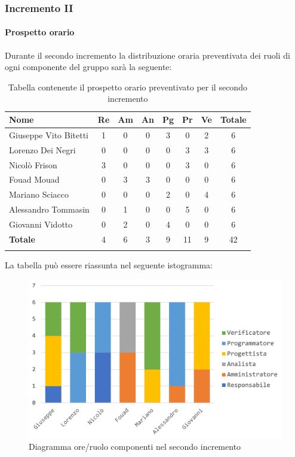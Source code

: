 		
		
		\subsubsection{Incremento II}
			\paragraph{Prospetto orario}
			Durante il secondo incremento la distribuzione oraria preventivata dei ruoli di ogni componente del gruppo sarà la seguente:
			
			\begin{longtable}{|l|c|c|c|c|c|c|c|}
				\hline
				\rowcolor{lighter-grayer}
				\textbf{Nome} & \textbf{Re} & \textbf{Am} & \textbf{An} & \textbf{Pg}  & \textbf{Pr}   & \textbf{Ve} & \textbf{Totale} \\
				\hline
				\endfirsthead
				
				\hline
				Giuseppe Vito Bitetti 		 & 1 & 0 & 0 & 3 & 0 & 2 & 6\\
				\hline
				\hline
				Lorenzo Dei Negri			 & 0 & 0 & 0 & 0 & 3 & 3 & 6\\
				\hline
				\hline
				Nicolò Frison				    & 3 & 0 & 0 & 0 & 3 & 0 & 6\\
				\hline
				\hline
				Fouad Mouad 				 & 0 & 3 & 3 & 0 & 0 & 0 & 6\\
				\hline
				\hline
				Mariano Sciacco 			 & 0 & 0 & 0 & 2 & 0 & 4 & 6\\
				\hline
				\hline
				Alessandro Tommasin    & 0 & 1 & 0 & 0 & 5 & 0 & 6\\
				\hline
				\hline
				Giovanni Vidotto 			 & 0 & 2 & 0 & 4 & 0 & 0 & 6\\
				\hline 
				\textbf{Totale}			 		& 4 & 6 & 3 & 9 & 11 & 9 & 42\\
				\hline
				\caption{Tabella contenente il prospetto orario preventivato per il secondo incremento}
			\end{longtable}
			\pagebreak
			
			La tabella può essere riassunta nel seguente istogramma:
			\begin{figure}[H]
				\centering
				\includegraphics[width=0.8\linewidth]{./images/preventivo/incremento2-1.png}
				\caption{Diagramma ore/ruolo componenti nel secondo incremento}
				\label{fig:diagramma suddivione ruoli incremento II}
			\end{figure}
			
